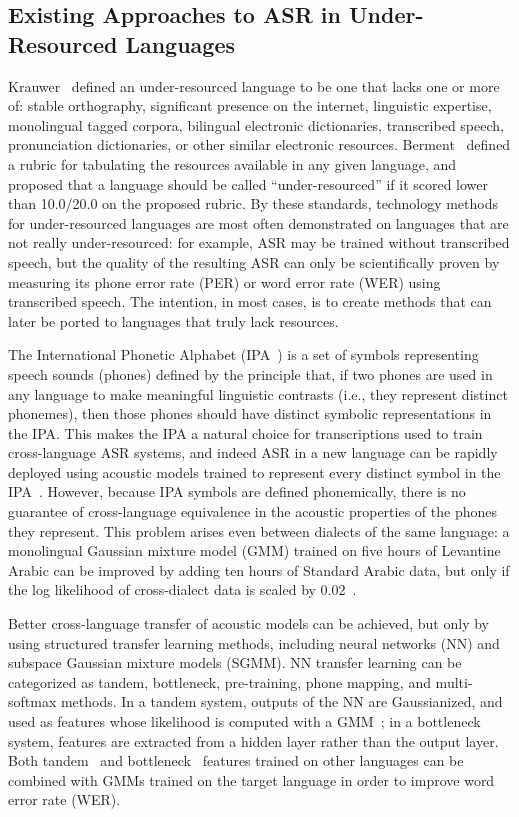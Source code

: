 \subsection{Existing Approaches to ASR in Under-Resourced Languages}

Krauwer~\cite{Krauwer2003} defined an under-resourced language to be
one that lacks one or more of: stable orthography, significant
presence on the internet, linguistic expertise, monolingual tagged
corpora, bilingual electronic dictionaries, transcribed speech,
pronunciation dictionaries, or other similar electronic resources.
Berment~\cite{Berment2004} defined a rubric for tabulating the
resources available in any given language, and proposed that a
language should be called ``under-resourced'' if it scored lower than
10.0/20.0 on the proposed rubric.  By these standards, technology
methods for under-resourced languages are most often demonstrated on
languages that are not really under-resourced: for example, ASR may be
trained without transcribed speech, but the quality of the resulting
ASR can only be scientifically proven by measuring its phone error
rate (PER) or word error rate (WER) using transcribed speech.  The
intention, in most cases, is to create methods that can later be
ported to languages that truly lack resources.

The International Phonetic Alphabet (IPA~\cite{ipa1993}) is a set of
symbols representing speech sounds (phones) defined by the principle
that, if two phones are used in any language to make meaningful
linguistic contrasts (i.e., they represent distinct phonemes), then
those phones should have distinct symbolic representations in the IPA.
This makes the IPA a natural choice for transcriptions used to train
cross-language ASR systems, and indeed ASR in a new language can be 
rapidly deployed using acoustic models trained to represent every 
distinct symbol in the IPA~\cite{Schultz2001}.
However, because IPA symbols are defined phonemically, there is no
guarantee of cross-language equivalence in the acoustic properties of
the phones they represent. This problem arises even between dialects of
the same language: a monolingual Gaussian mixture model (GMM) trained on
five hours of Levantine Arabic can be improved by adding ten hours of
Standard Arabic data, but only if the log likelihood of cross-dialect
data is scaled by 0.02~\cite{Huang2012}.

Better cross-language transfer of acoustic models can be achieved, but only
by using structured transfer learning methods, including neural networks
(NN) and subspace Gaussian mixture models (SGMM).
NN transfer learning can be categorized as tandem, bottleneck,
pre-training, phone mapping, and multi-softmax methods.  In a tandem
system, outputs of the NN are Gaussianized, and used as features whose
likelihood is computed with a GMM~\cite{Hermansky2000}; in a
bottleneck system, features are extracted from a hidden layer rather
than the output layer. Both tandem~\cite{Stolcke2006} and
bottleneck~\cite{Vesely2012} features trained on other languages can
be combined with GMMs trained on the target language in order to
improve word error rate (WER).

